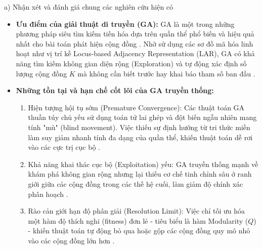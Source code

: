 \documentclass[14pt,a4paper]{extarticle}
\begin{document}
\noindent a) Nhận xét và đánh giá chung các nghiên cứu hiện có
\begin{itemize}
    \item \textbf{Ưu điểm của giải thuật di truyền (GA):} GA là một trong những phương pháp siêu tìm kiếm tiến hóa dựa trên quần thể phổ biến và hiệu quả nhất cho bài toán phát hiện cộng đồng \cite{Chen2019, Baraa2021}. Nhờ sử dụng các sơ đồ mã hóa linh hoạt như vị trí kề Locus-based Adjacency Representation (LAR), GA có khả năng tìm kiếm không gian diện rộng (Exploration) và tự động xác định số lượng cộng đồng $K$ mà không cần biết trước hay khai báo tham số ban đầu \cite{Chen2019}.
    \item \textbf{Những tồn tại và hạn chế cốt lõi của GA truyền thống:}
    \begin{enumerate}
        \item Hiện tượng hội tụ sớm (Premature Convergence): Các thuật toán GA thuần túy chủ yếu sử dụng toán tử lai ghép và đột biến ngẫu nhiên mang tính "mù" (blind movement). Việc thiếu sự định hướng từ tri thức miền làm suy giảm nhanh tính đa dạng của quần thể, khiến thuật toán dễ rơi vào các cực trị cục bộ \cite{Chen2019}.
        \item Khả năng khai thác cục bộ (Exploitation) yếu: GA truyền thống mạnh về khám phá không gian rộng nhưng lại thiếu cơ chế tinh chỉnh sâu ở ranh giới giữa các cộng đồng trong các thế hệ cuối, làm giảm độ chính xác phân hoạch \cite{Baraa2021}.
        \item Rào cản giới hạn độ phân giải (Resolution Limit): Việc chỉ tối ưu hóa một hàm độ thích nghi (fitness) đơn lẻ - tiêu biểu là hàm Modularity ($Q$) - khiến thuật toán tự động bỏ qua hoặc gộp các cộng đồng quy mô nhỏ vào các cộng đồng lớn hơn \cite{Baraa2021}.
    \end{enumerate}
\end{itemize}
\end{document}
